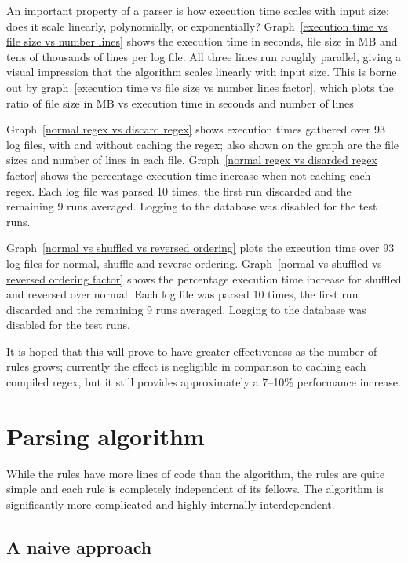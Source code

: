 \documentclass[a4paper,12pt,draft]{article}
\begin{document}
An important property of a parser is how execution time scales with input
size: does it scale linearly, polynomially, or exponentially?
Graph~\ref{execution time vs file size vs number lines} shows the execution
time in seconds, file size in MB and tens of thousands of lines per log
file.  All three lines run roughly parallel, giving a visual impression
that the algorithm scales linearly with input size.  This is borne out by
graph~\ref{execution time vs file size vs number lines factor}, which plots
the ratio of file size in MB vs execution time in seconds and number of
lines

Graph~\ref{normal regex vs discard regex} shows execution times gathered
over 93 log files, with and without caching the regex; also shown on the
graph are the file sizes and number of lines in each file.
Graph~\ref{normal regex vs disarded regex factor} shows the percentage
execution time increase when not caching each regex.  Each log file was
parsed 10 times, the first run discarded and the remaining 9 runs averaged.
Logging to the database was disabled for the test runs.
        
        
Graph~\ref{normal vs shuffled vs reversed ordering} plots the execution
time over 93 log files for normal, shuffle and reverse ordering.
Graph~\ref{normal vs shuffled vs reversed ordering factor} shows the
percentage execution time increase for shuffled and reversed over normal.
Each log file was parsed 10 times, the first run discarded and the
remaining 9 runs averaged.  Logging to the database was disabled for the
test runs.

It is hoped that this will prove to have greater effectiveness as the
number of rules grows; currently the effect is negligible in comparison to
caching each compiled regex, but it still provides approximately a 7--10\%
performance increase.

\section{Parsing algorithm}

\label{parsing-algorithm}

While the rules have more lines of code than the algorithm, the rules are
quite simple and each rule is completely independent of its fellows.  The
algorithm is significantly more complicated and highly internally
interdependent.


\subsection{A naive approach}
\end{document}
